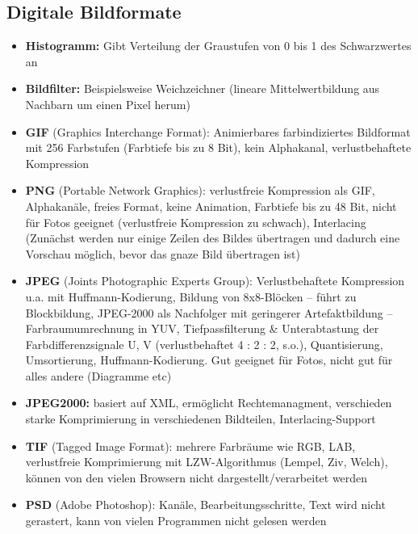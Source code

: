 \documentclass[12pt,landscape]{article}
\begin{document}
\begin{multicols}{3}
\subsection{Digitale Bildformate}
\begin{itemize}
\item \textbf{Histogramm:} Gibt Verteilung der Graustufen von 0 bis 1 des Schwarzwertes an
\item \textbf{Bildfilter:} Beispielsweise Weichzeichner (lineare Mittelwertbildung aus Nachbarn um einen Pixel herum)
\item \textbf{GIF} (Graphics Interchange Format): Animierbares farbindiziertes Bildformat mit 256 Farbstufen (Farbtiefe bis zu 8 Bit), kein Alphakanal, verlustbehaftete Kompression
\item \textbf{PNG} (Portable Network Graphics): verlustfreie Kompression als GIF, Alphakanäle, freies Format, keine Animation, Farbtiefe bis zu 48 Bit, nicht für Fotos geeignet (verlustfreie Kompression zu schwach), Interlacing (Zunächst werden nur einige Zeilen des Bildes übertragen und dadurch eine Vorschau möglich, bevor das gnaze Bild übertragen ist)
\item \textbf{JPEG} (Joints Photographic Experts Group): Verlustbehaftete Kompression u.a. mit Huffmann-Kodierung, Bildung von 8x8-Blöcken -- führt zu Blockbildung, JPEG-2000 als Nachfolger mit geringerer Artefaktbildung -- Farbraumumrechnung in YUV, Tiefpassfilterung \& Unterabtastung der Farbdifferenzsignale U, V (verlustbehaftet 4 : 2 : 2, s.o.), Quantisierung, Umsortierung, Huffmann-Kodierung. Gut geeignet für Fotos, nicht gut für alles andere (Diagramme etc)
\item \textbf{JPEG2000:} basiert auf XML, ermöglicht Rechtemanagment, verschieden starke Komprimierung in verschiedenen Bildteilen, Interlacing-Support
\item \textbf{TIF} (Tagged Image Format): mehrere Farbräume wie RGB, LAB, verlustfreie Komprimierung mit LZW-Algorithmus (Lempel, Ziv, Welch), können von den vielen Browsern nicht  dargestellt/verarbeitet werden
\item \textbf{PSD} (Adobe Photoshop): Kanäle, Bearbeitungsschritte, Text wird nicht gerastert, kann von vielen Programmen nicht gelesen werden
\end{itemize}

\end{multicols}
\end{document}
